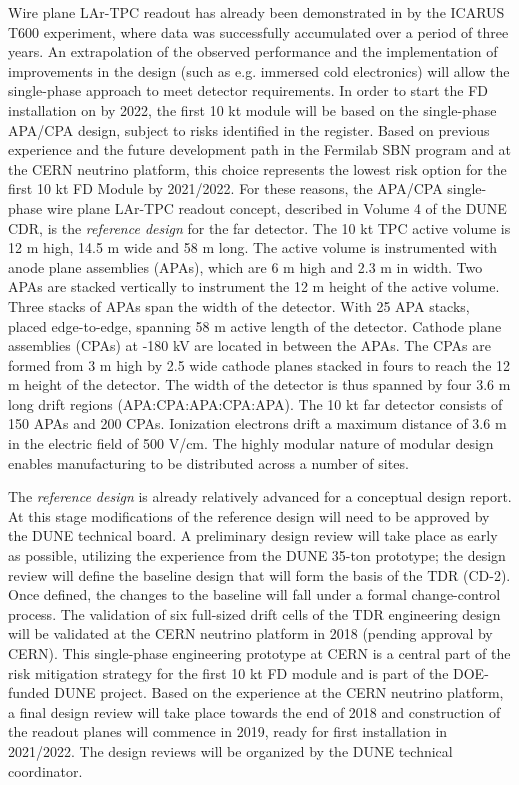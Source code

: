 Wire plane LAr-TPC readout has already been demonstrated in by the ICARUS T600 
experiment, where data was successfully accumulated over a period of three years. 
An extrapolation of the observed performance and the implementation of improvements 
in the design (such as e.g. immersed cold electronics) will allow the single-phase 
approach to meet detector requirements. In order to start the FD installation on 
by 2022, the first 10 kt module will be based on the single-phase APA/CPA design, 
subject to risks identified in the register. Based on previous experience and the 
future development path in the Fermilab SBN program and at the CERN neutrino platform, 
this choice represents the lowest risk option for the first 10 kt FD Module by 
2021/2022. For these reasons, the APA/CPA single-phase wire plane LAr-TPC readout 
concept, described in Volume 4 of the DUNE CDR, is the \textit{reference design} 
for the far detector. The 10 kt TPC active volume is 12 m high, 14.5 m wide and 
58 m long. The active volume is instrumented with anode plane assemblies (APAs), 
which are 6 m high and 2.3 m in width. Two APAs are stacked vertically to instrument 
the 12 m height of the active volume. Three stacks of APAs span the width of the 
detector. With 25 APA stacks, placed edge-to-edge, spanning 58 m active length 
of the detector. Cathode plane assemblies (CPAs) at -180 kV are located in between 
the APAs. The CPAs are formed from 3 m high by 2.5 wide cathode planes stacked 
in fours to reach the 12 m height of the detector.  The width of the detector is 
thus spanned by four 3.6 m long drift regions (APA:CPA:APA:CPA:APA). The 10 kt 
far detector consists of 150 APAs and 200 CPAs. Ionization electrons drift a maximum 
distance of 3.6 m in the electric field of 500 V/cm. The highly modular nature 
of modular design enables manufacturing to be distributed across a number of sites.

The \textit{reference design} is already relatively advanced for a conceptual design 
report. At this stage modifications of the reference design will need to be approved 
by the DUNE technical board. A preliminary design review will take place as early 
as possible, utilizing the experience from the DUNE 35-ton prototype; the design 
review will define the baseline design that will form the basis of the TDR (CD-2). 
Once defined, the changes to the baseline will fall under a formal change-control 
process. The validation of six full-sized drift cells of the TDR engineering design 
will be validated at the CERN neutrino platform in 2018 (pending approval by CERN). 
This single-phase engineering prototype at CERN is a central part of the risk mitigation 
strategy for the first 10 kt FD module and is part of the DOE-funded DUNE project. 
Based on the experience at the CERN neutrino platform, a final design review will 
take place towards the end of 2018 and construction of the readout planes will 
commence in 2019, ready for first installation in 2021/2022. The design reviews 
will be organized by the DUNE technical coordinator.

